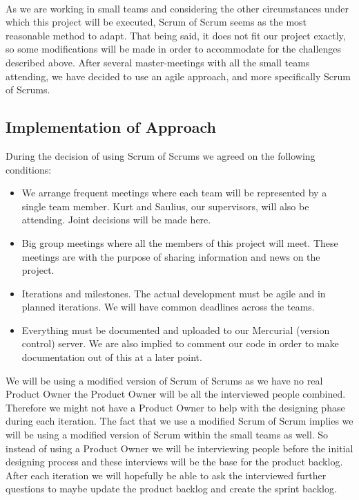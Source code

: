 \paragraph{}
As we are working in small teams and considering the other circumstances under which this project will be executed, Scrum of Scrum seems as the most reasonable method to adapt. That being said, it does not fit our project exactly, so some modifications will be made in order to accommodate for the challenges described above.
After several master-meetings with all the small teams attending, we have decided to use an agile approach, and more specifically Scrum of Scrums.

\subsection{Implementation of Approach}
During the decision of using Scrum of Scrums we agreed on the following conditions:

\begin{itemize}
	\item We arrange frequent meetings where each team will be represented by a single team member. Kurt and Saulius, our supervisors, will also be attending. Joint decisions will be made here.
	\item Big group meetings where all the members of this project will meet. These meetings are with the purpose of sharing information and news on the project.
	\item Iterations and milestones. The actual development must be agile and in planned iterations. We will have common deadlines across the teams. 
	\item Everything must be documented and uploaded to our Mercurial (version control) server. We are also implied to comment our code in order to make documentation out of this at a later point.
\end{itemize}

We will be using a modified version of Scrum of Scrums as we have no real Product Owner the Product Owner will be all the interviewed people combined. Therefore we might not have a Product Owner to help with the designing phase during each iteration. The fact that we use a modified Scrum of Scrum implies we will be using a modified version of Scrum within the small teams as well. So instead of using a Product Owner we will be interviewing people before the initial designing process and these interviews will be the base for the product backlog. After each iteration we will hopefully be able to ask the interviewed further questions to maybe update the product backlog and create the sprint backlog.

